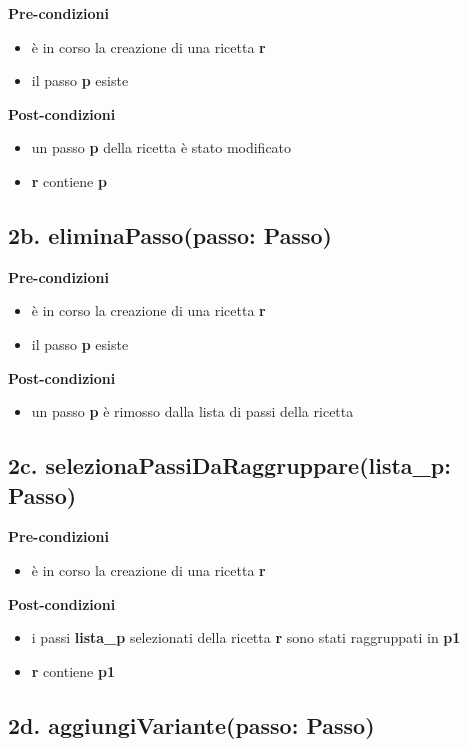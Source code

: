\documentclass[12pt]{extarticle}
\begin{document}
\textbf{Pre-condizioni}
\begin{itemize}
  \item è in corso la creazione di una ricetta  \textbf{r}
  \item il passo  \textbf{p} esiste
\end{itemize}
\textbf{Post-condizioni}
\begin{itemize}
  \item un passo  \textbf{p} della ricetta è stato modificato
  \item  \textbf{r} contiene  \textbf{p}
\end{itemize}

\subsection*{2b. eliminaPasso(passo: Passo)}

\textbf{Pre-condizioni}
\begin{itemize}
  \item è in corso la creazione di una ricetta  \textbf{r}
  \item il passo  \textbf{p} esiste
\end{itemize}
\textbf{Post-condizioni}
\begin{itemize}
  \item un passo  \textbf{p} è rimosso dalla lista di passi della ricetta
\end{itemize}

\subsection*{2c. selezionaPassiDaRaggruppare(lista\_p: Passo)}

\textbf{Pre-condizioni}
\begin{itemize}
  \item è in corso la creazione di una ricetta  \textbf{r}
\end{itemize}
\textbf{Post-condizioni}
\begin{itemize}
  \item i passi  \textbf{lista\_p} selezionati della ricetta  \textbf{r} sono stati raggruppati in  \textbf{p1}
  \item  \textbf{r} contiene  \textbf{p1}
\end{itemize}

\subsection*{2d. aggiungiVariante(passo: Passo)}
\end{document}
